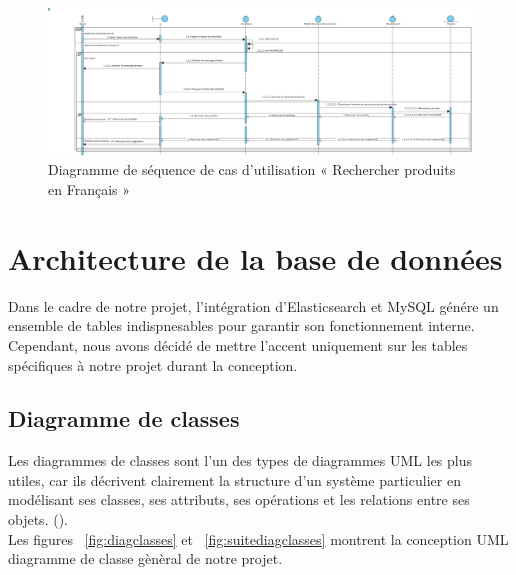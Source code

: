 \begin{figure}[H]
	\centering
	\includegraphics[width=1\textwidth]{logos/seqsprint1.png}
	\caption{Diagramme de séquence de cas d’utilisation « Rechercher produits en Français »}
	\label{fig:seqrecherchefrancais}
\end{figure}

\section{Architecture de la base de données}
\noindent
Dans le cadre de notre projet, l'intégration d'Elasticsearch et MySQL génére un ensemble de tables indispnesables pour garantir son fonctionnement interne. Cependant, nous avons décidé de mettre l'accent uniquement sur les tables
spécifiques à notre projet durant la conception.

\subsection{Diagramme de classes}
\noindent
Les diagrammes de classes sont l'un des types de diagrammes UML les plus utiles, car ils décrivent clairement la structure d’un système particulier en modélisant ses classes, ses attributs, ses opérations et les relations entre ses objets.  (\cite{lucidcharts:classdiagram}). \\
Les figures ~\ref{fig:diagclasses} et ~\ref{fig:suitediagclasses} montrent la conception UML diagramme de classe gènèral de notre projet.

